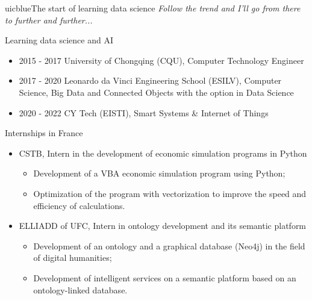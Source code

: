 \documentclass{beamer}
\begin{document}
	\begin{chapter}{uicblue}{The start of learning data science}
		\textit{Follow the trend and I'll go from there to further and further...}
	\end{chapter}
	
	\begin{frame}[fragile]{Learning data science and AI}
		\begin{itemize}[<+->]
			\item 2015 - 2017 University of Chongqing (CQU), Computer Technology Engineer
			\item 2017 - 2020 Leonardo da Vinci Engineering School (ESILV), Computer Science, Big Data and Connected Objects with the option in Data Science 
			\item 2020 - 2022 CY Tech (EISTI), Smart Systems \& Internet of Things 
		\end{itemize}
	\end{frame}
	
	\begin{frame}[fragile]{Internships in France}
		\begin{itemize}
			\item CSTB, Intern in the development of economic simulation programs in Python
			\begin{itemize}
				\item Development of a VBA economic simulation program using Python;
				\item Optimization of the program with vectorization to improve the speed and efficiency of calculations.
			\end{itemize}
			\item ELLIADD of UFC, Intern in ontology development and its semantic platform
			\begin{itemize}
				\item Development of an ontology and a graphical database (Neo4j) in the field of digital humanities;
				\item Development of intelligent services on a semantic platform based on an ontology-linked database.
			\end{itemize}
		\end{itemize}
	\end{frame}
	
\end{document}
